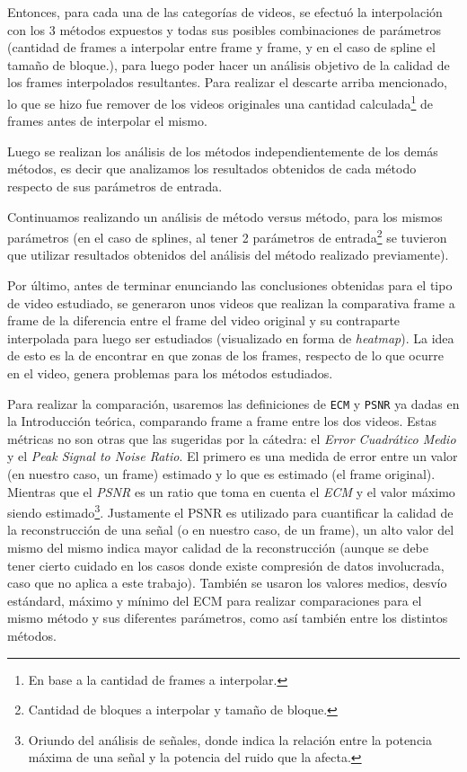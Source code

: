 \par Entonces, para cada una de las categor\'ias de videos, se efectu\'o la
interpolaci\'on con los 3 m\'etodos expuestos y todas sus posibles
combinaciones de par\'ametros (cantidad de frames a interpolar entre frame y
frame, y en el caso de spline el tama\~no de bloque.), para luego poder hacer
un an\'alisis objetivo de la calidad de los frames interpolados resultantes.
Para realizar el descarte arriba mencionado, lo que se hizo fue remover de los
videos originales una cantidad calculada\footnote{En base a la cantidad de
frames a interpolar.} de frames antes de interpolar el mismo.

\par Luego se realizan los an\'alisis de los m\'etodos independientemente de los
dem\'as m\'etodos, es decir que analizamos los resultados obtenidos de cada
m\'etodo respecto de sus par\'ametros de entrada.

\par Continuamos realizando un an\'alisis de m\'etodo versus m\'etodo, para
los mismos par\'ametros (en el caso de splines, al tener 2 par\'ametros de
entrada\footnote{Cantidad de bloques a interpolar y tama\~no de bloque.} se
tuvieron que utilizar resultados obtenidos del an\'alisis del m\'etodo
realizado previamente).

\par Por \'ultimo, antes de terminar enunciando las conclusiones obtenidas para
el tipo de video estudiado, se generaron unos videos que realizan la
comparativa frame a frame de la diferencia entre el frame del video original y
su contraparte interpolada para luego ser estudiados (visualizado en forma de
\emph{heatmap}). La idea de esto es la de encontrar en que zonas de los frames,
respecto de lo que ocurre en el video, genera problemas para los m\'etodos
estudiados.

\par Para realizar la comparación, usaremos las definiciones de \texttt{ECM} y
\texttt{PSNR} ya dadas en la Introducción teórica, comparando frame a frame
entre los dos videos. Estas m\'etricas no son otras que las sugeridas por la
c\'atedra: el \emph{Error Cuadr\'atico Medio}\cite{mse} y el \emph{Peak Signal
to Noise Ratio}\cite{psnr}. El primero es una medida de error entre un valor
(en nuestro caso, un frame) estimado y lo que es estimado (el frame original).
Mientras que el \emph{PSNR} es un ratio que toma en cuenta el \emph{ECM} y el
valor m\'aximo siendo estimado\footnote{Oriundo del an\'alisis de se\~nales,
donde indica la relaci\'on entre la potencia m\'axima de una se\~nal y la
potencia del ruido que la afecta.}. Justamente el PSNR es utilizado para
cuantificar la calidad de la reconstrucci\'on de una se\~nal (o en nuestro
caso, de un frame), un alto valor del mismo del mismo indica mayor calidad de
la reconstrucci\'on (aunque se debe tener cierto cuidado en los casos donde
existe compresi\'on de datos involucrada, caso que no aplica a este trabajo).
Tambi\'en se usaron los valores medios, desv\'io est\'andard, m\'aximo y
m\'inimo del ECM para realizar comparaciones para el mismo m\'etodo y sus
diferentes par\'ametros, como as\'i tambi\'en entre los distintos m\'etodos.

